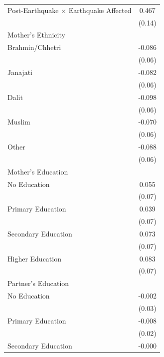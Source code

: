 \begin{longtable}{l*{1}{c}}
Post-Earthquake × Earthquake Affected & 0.467\sym{***} \\
                    & (0.14) \\
\multicolumn{2}{l}{Mother's Ethnicity} \\
\hspace{1em}Brahmin/Chhetri & -0.086 \\
                    & (0.06) \\
\hspace{1em}Janajati & -0.082 \\
                    & (0.06) \\
\hspace{1em}Dalit & -0.098 \\
                    & (0.06) \\
\hspace{1em}Muslim & -0.070 \\
                    & (0.06) \\
\hspace{1em}Other & -0.088 \\
                    & (0.06) \\
\multicolumn{2}{l}{Mother's Education} \\
\hspace{1em}No Education & 0.055 \\
                    & (0.07) \\
\hspace{1em}Primary Education & 0.039 \\
                    & (0.07) \\
\hspace{1em}Secondary Education & 0.073 \\
                    & (0.07) \\
\hspace{1em}Higher Education & 0.083 \\
                    & (0.07) \\
\multicolumn{2}{l}{Partner's Education} \\
\hspace{1em}No Education & -0.002 \\
                    & (0.03) \\
\hspace{1em}Primary Education & -0.008 \\
                    & (0.02) \\
\hspace{1em}Secondary Education & -0.000 \\

\end{longtable}
